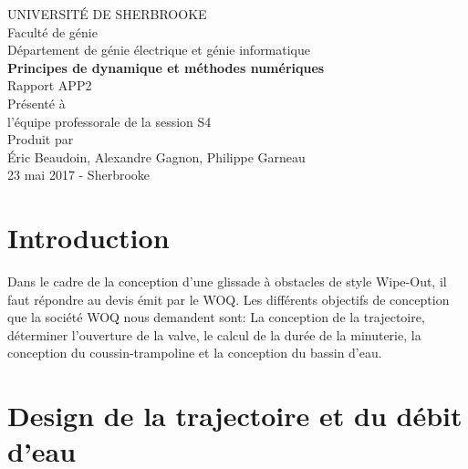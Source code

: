 \documentclass{article}
\begin{document}
\begin{titlepage}   
	\large{
		\begin{center}
			UNIVERSITÉ DE SHERBROOKE\\Faculté de génie\\
			Département de génie électrique et génie informatique\\
			\vspace{3cm}
			{\LARGE\textbf{Principes de dynamique et méthodes numériques}}\\
			\vspace{2cm}
			\LARGE{Rapport APP2}\\
			\vspace{2cm}
			Présenté à\\l'équipe professorale de la session S4\\
			\vspace{2cm}
			Produit par\\Éric Beaudoin, Alexandre Gagnon, Philippe Garneau\\
			\vspace{1cm}
			\vfill{23 mai 2017 - Sherbrooke}
		\end{center}
	}
\end{titlepage}
\newpage
\tableofcontents

\newpage
\section{Introduction}
Dans le cadre de la conception d'une glissade à obstacles de style Wipe-Out, il faut répondre au devis émit par le WOQ. Les différents objectifs de conception que la société WOQ nous demandent sont: La conception de la trajectoire, déterminer l'ouverture de la valve, le calcul de la durée de la minuterie, la conception du coussin-trampoline et la conception du bassin d'eau.

\section{Design de la trajectoire et du débit d'eau}
\end{document}
